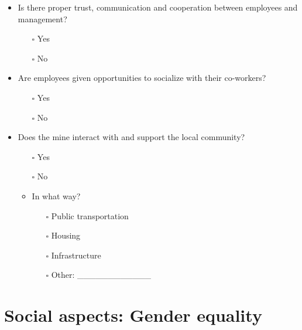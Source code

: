 \documentclass[
  12pt,
]{scrbook}
\providecommand{\tightlist}{%
  \setlength{\itemsep}{0pt}\setlength{\parskip}{0pt}}
\begin{document}
\begin{itemize}
\item
  Is there proper trust, communication and cooperation between employees and management?

  \begin{itemize}
  \tightlist
  \item[$\square$]
    Yes
  \item[$\square$]
    No
  \end{itemize}
\item
  Are employees given opportunities to socialize with their co-workers?

  \begin{itemize}
  \tightlist
  \item[$\square$]
    Yes
  \item[$\square$]
    No
  \end{itemize}
\item
  Does the mine interact with and support the local community?

  \begin{itemize}
  \item[$\square$]
    Yes
  \item[$\square$]
    No
  \item
    In what way?

    \begin{itemize}
    \tightlist
    \item[$\square$]
      Public transportation
    \item[$\square$]
      Housing
    \item[$\square$]
      Infrastructure
    \item[$\square$]
      Other: \_\_\_\_\_\_\_\_\_\_\_\_
    \end{itemize}
  \end{itemize}
\end{itemize}

\hypertarget{social-aspects-gender-equality}{%
\section*{Social aspects: Gender equality}\label{social-aspects-gender-equality}}
\end{document}
